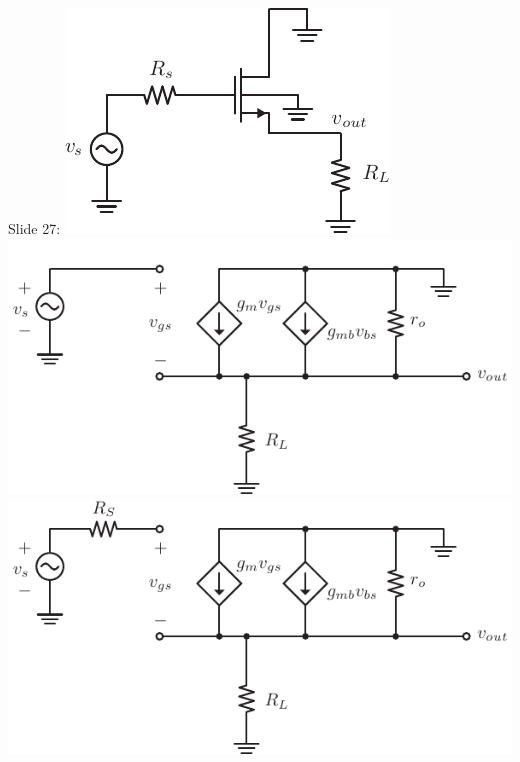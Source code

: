Slide 27:
\includegraphics[width=.75\columnwidth]{cd_amp_ac_body}
\includegraphics[width=.75\columnwidth]{cd_amp_ss_av_body 2}
\includegraphics[width=.75\columnwidth]{cd_amp_ss_av_body 3}

